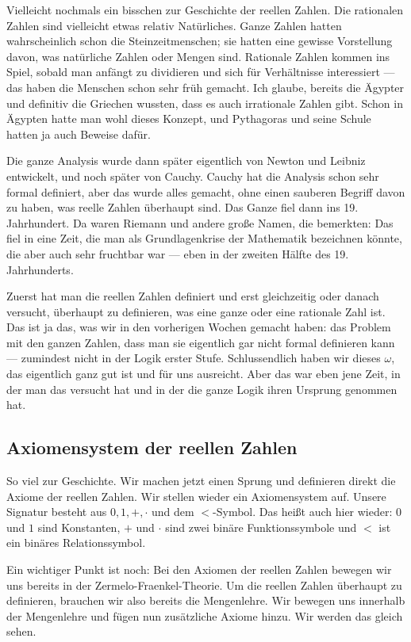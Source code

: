 \begin{spoken-clean}[00:11:09 - 00:13:35]
Vielleicht nochmals ein bisschen zur Geschichte der reellen Zahlen. Die rationalen Zahlen sind vielleicht etwas relativ Natürliches. Ganze Zahlen hatten wahrscheinlich schon die Steinzeitmenschen; sie hatten eine gewisse Vorstellung davon, was natürliche Zahlen oder Mengen sind. Rationale Zahlen kommen ins Spiel, sobald man anfängt zu dividieren und sich für Verhältnisse interessiert --- das haben die Menschen schon sehr früh gemacht. Ich glaube, bereits die Ägypter und definitiv die Griechen wussten, dass es auch irrationale Zahlen gibt. Schon in Ägypten hatte man wohl dieses Konzept, und Pythagoras und seine Schule hatten ja auch Beweise dafür.

Die ganze Analysis wurde dann später eigentlich von Newton und Leibniz entwickelt, und noch später von Cauchy. Cauchy hat die Analysis schon sehr formal definiert, aber das wurde alles gemacht, ohne einen sauberen Begriff davon zu haben, was reelle Zahlen überhaupt sind. Das Ganze fiel dann ins 19. Jahrhundert. Da waren Riemann und andere große Namen, die bemerkten:  Das fiel in eine Zeit, die man als Grundlagenkrise der Mathematik bezeichnen könnte, die aber auch sehr fruchtbar war --- eben in der zweiten Hälfte des 19. Jahrhunderts.

Zuerst hat man die reellen Zahlen definiert und erst gleichzeitig oder danach versucht, überhaupt zu definieren, was eine ganze oder eine rationale Zahl ist. Das ist ja das, was wir in den vorherigen Wochen gemacht haben: das Problem mit den ganzen Zahlen, dass man sie eigentlich gar nicht formal definieren kann --- zumindest nicht in der Logik erster Stufe. Schlussendlich haben wir dieses $\omega$, das eigentlich ganz gut ist und für uns ausreicht. Aber das war eben jene Zeit, in der man das versucht hat und in der die ganze Logik ihren Ursprung genommen hat.
\end{spoken-clean}

\subsection{Axiomensystem der reellen Zahlen}

\begin{spoken-clean}[00:13:35 - 00:14:40]
So viel zur Geschichte. Wir machen jetzt einen Sprung und definieren direkt die Axiome der reellen Zahlen. Wir stellen wieder ein Axiomensystem auf. Unsere Signatur besteht aus $0, 1, +, \cdot$ und dem $<$-Symbol. Das heißt auch hier wieder: $0$ und $1$ sind Konstanten, $+$ und $\cdot$ sind zwei binäre Funktionssymbole und $<$ ist ein binäres Relationssymbol.

Ein wichtiger Punkt ist noch: Bei den Axiomen der reellen Zahlen bewegen wir uns bereits in der Zermelo-Fraenkel-Theorie. Um die reellen Zahlen überhaupt zu definieren, brauchen wir also bereits die Mengenlehre. Wir bewegen uns innerhalb der Mengenlehre und fügen nun zusätzliche Axiome hinzu. Wir werden das gleich sehen.
\end{spoken-clean}

